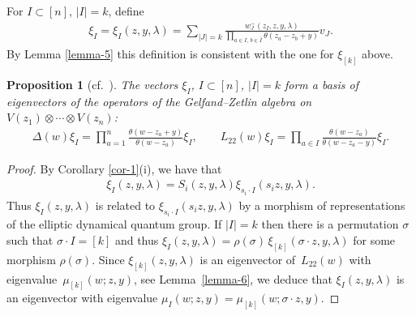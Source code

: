 \documentclass[10pt,a4paper]{amsart}
\numberwithin{equation}{section}
\newtheorem{Proposition}[Theorem]{Proposition}
 { \theoremstyle{definition}
\newtheorem{Definition}[Theorem]{Definition}
\newtheorem{Example}[Theorem]{Example}
\newtheorem{Remark}[Theorem]{Remark} }
\begin{document}
For $I\subset[n]$, $|I|=k$, define
\begin{gather}\label{e-xi}
 \xi_I=\xi_I(z,y,\lambda)= \sum_{|J|=k}\frac{w^-_J(z_I,z,y,\lambda)}{\prod\limits_{a\in I,\, b\in\bar I}\theta(z_a-z_b+y)} v_J.
\end{gather}
By Lemma \ref{lemma-5} this definition is consistent with the one for
$\xi_{[k]}$ above.
\begin{Proposition}[{cf.~\cite{GRTV,RTV2,RV2}}]\label{prop-5} The vectors $\xi_I$, $I\subset[n]$, $|I|=k$ form a basis of eigenvectors of the operators of the Gelfand--Zetlin algebra on $V(z_1)\otimes\cdots\otimes V(z_n)$:
 \begin{gather*}
 \Delta(w)\xi_I=\prod_{a=1}^n\frac{\theta(w-z_a+y)}{\theta(w-z_a)} \xi_I, \qquad L_{22}(w)\xi_I= \prod_{a\in I}\frac{\theta(w-z_a)}{\theta(w-z_a-y)} \xi_I.
 \end{gather*}
\end{Proposition}
\begin{proof}
 By Corollary \ref{cor-1}(i), we have that
 \begin{gather*}
 \xi_I(z,y,\lambda) =S_i(z,y,\lambda)\xi_{s_i\cdot I}(s_iz,y,\lambda).
 \end{gather*}
Thus $\xi_I(z,y,\lambda)$ is related to $\xi_{s_i\cdot I}(s_iz,y,\lambda)$ by a morphism of representations of the elliptic dynamical quantum group. If $|I|=k$ then there is a permutation $\sigma$ such that $\sigma\cdot I=[k]$ and thus $\xi_I(z,y,\lambda)=\rho(\sigma)\,\xi_{[k]}(\sigma\cdot z,y,\lambda)$ for some morphism $\rho(\sigma)$. Since $\xi_{[k]}(z,y,\lambda)$ is an eigenvector of~$L_{22}(w)$ with eigenvalue~$\mu_{[k]}(w;z,y)$, see Lemma~\ref{lemma-6}, we deduce that $\xi_I(z,y,\lambda)$ is an eigenvector with eigenvalue $\mu_I(w;z,y)=\mu_{[k]}(w;\sigma\cdot z,y)$.
\end{proof}
\end{document}
